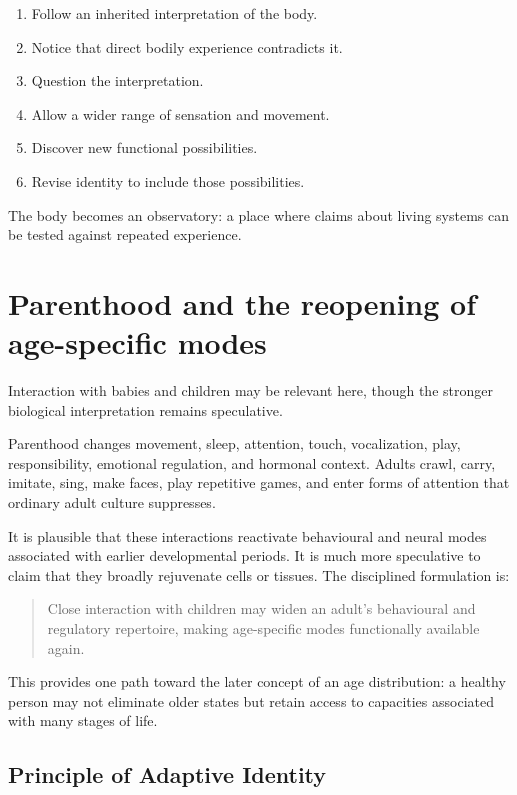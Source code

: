 \begin{enumerate}
\def\labelenumi{\arabic{enumi}.}
\tightlist
\item
  Follow an inherited interpretation of the body.
\item
  Notice that direct bodily experience contradicts it.
\item
  Question the interpretation.
\item
  Allow a wider range of sensation and movement.
\item
  Discover new functional possibilities.
\item
  Revise identity to include those possibilities.
\end{enumerate}

The body becomes an observatory: a place where claims about living systems can be tested against repeated experience.

\section{Parenthood and the reopening of age-specific modes}

Interaction with babies and children may be relevant here, though the stronger biological interpretation remains speculative.

Parenthood changes movement, sleep, attention, touch, vocalization, play, responsibility, emotional regulation, and hormonal context. Adults crawl, carry, imitate, sing, make faces, play repetitive games, and enter forms of attention that ordinary adult culture suppresses.

It is plausible that these interactions reactivate behavioural and neural modes associated with earlier developmental periods. It is much more speculative to claim that they broadly rejuvenate cells or tissues. The disciplined formulation is:

\begin{quote}
Close interaction with children may widen an adult's behavioural and regulatory repertoire, making age-specific modes functionally available again.
\end{quote}

This provides one path toward the later concept of an age distribution: a healthy person may not eliminate older states but retain access to capacities associated with many stages of life.

\subsection{Principle of Adaptive Identity}

